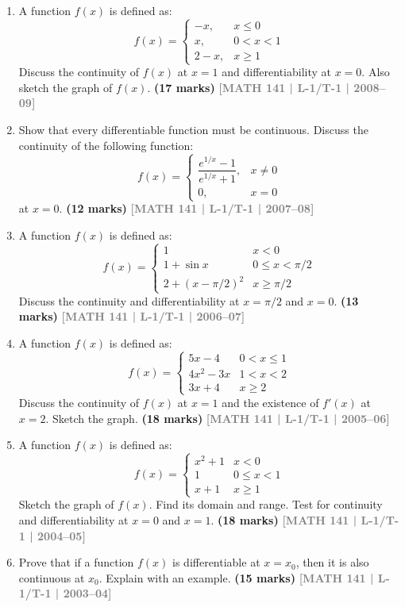 \documentclass[12pt,a4paper]{article}
\newcommand{\yr}[1]{\hfill\textcolor{gray}{\small\textbf{[#1]}}}
\newcommand{\mk}[1]{\textcolor{orange!70!black}{\small\textbf{(#1 marks)}}}
\begin{document}
\begin{enumerate}
\item A function $f(x)$ is defined as:
\[
f(x)=\begin{cases}-x, & x\le 0\\ x, & 0<x<1\\ 2-x, & x\ge 1\end{cases}
\]
Discuss the continuity of $f(x)$ at $x=1$ and differentiability at $x=0$. Also sketch the graph of $f(x)$.
\mk{17} \yr{MATH 141 | L-1/T-1 | 2008--09}

\item Show that every differentiable function must be continuous. Discuss the continuity of the following function:
\[
f(x)=\begin{cases}\dfrac{e^{1/x}-1}{e^{1/x}+1}, & x\neq 0\\[6pt] 0, & x=0\end{cases}
\]
at $x=0$.
\mk{12} \yr{MATH 141 | L-1/T-1 | 2007--08}

\item A function $f(x)$ is defined as:
\[
f(x)=\begin{cases}1 & x<0\\ 1+\sin x & 0\le x<\pi/2\\ 2+(x-\pi/2)^{2} & x\ge\pi/2\end{cases}
\]
Discuss the continuity and differentiability at $x=\pi/2$ and $x=0$.
\mk{13} \yr{MATH 141 | L-1/T-1 | 2006--07}

\item A function $f(x)$ is defined as:
\[
f(x)=\begin{cases}5x-4 & 0<x\le 1\\ 4x^{2}-3x & 1<x<2\\ 3x+4 & x\ge 2\end{cases}
\]
Discuss the continuity of $f(x)$ at $x=1$ and the existence of $f'(x)$ at $x=2$. Sketch the graph.
\mk{18} \yr{MATH 141 | L-1/T-1 | 2005--06}

\item A function $f(x)$ is defined as:
\[
f(x)=\begin{cases}x^{2}+1 & x<0\\ 1 & 0\le x<1\\ x+1 & x\ge 1\end{cases}
\]
Sketch the graph of $f(x)$. Find its domain and range. Test for continuity and differentiability at $x=0$ and $x=1$.
\mk{18} \yr{MATH 141 | L-1/T-1 | 2004--05}

\item Prove that if a function $f(x)$ is differentiable at $x=x_{0}$, then it is also continuous at $x_{0}$. Explain with an example.
\mk{15} \yr{MATH 141 | L-1/T-1 | 2003--04}

\end{enumerate}
\end{document}
